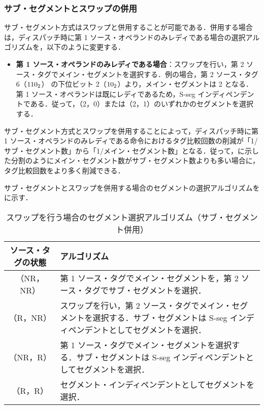 \subsubsection{サブ・セグメントとスワップの併用}
サブ・セグメント方式はスワップと併用することが可能である．併用する場合は，ディスパッチ時に第 1 ソース・オペランドのみレディである場合の選択アルゴリズムを，以下のように変更する．
\begin{itemize}
  \item \textbf{第 1 ソース・オペランドのみレディである場合}：スワップを行い，第 2 ソース・タグでメイン・セグメントを選択する．例の場合，第 2 ソース・タグ 6（${\rm 110_2}$） の下位ビット 2（${\rm 10_2}$）より，メイン・セグメントは 2 となる．第 1 ソース・オペランドは既にレディであるため，S-seg インディペンデントである．従って，（2，0）または（2，1）のいずれかのセグメントを選択する．
\end{itemize}
サブ・セグメント方式とスワップを併用することによって，ディスパッチ時に第 1 ソース・オペランドのみレディである命令におけるタグ比較回数の削減が「1/サブ・セグメント数」から「1/メイン・セグメント数」となる．従って，に示した分割のようにメイン・セグメント数がサブ・セグメント数よりも多い場合に，タグ比較回数をより多く削減できる．

サブ・セグメントとスワップを併用する場合のセグメントの選択アルゴリズムをに示す．

\begin{table}[htb]
  \caption{スワップを行う場合のセグメント選択アルゴリズム（サブ・セグメント併用）}
  \footnotesize
  \center
   \begin{tabular}{|c|p{13cm}|} \hline \hline
    ソース・タグの状態 & アルゴリズム \\ \hline
    （NR，NR） & 第 1 ソース・タグでメイン・セグメントを，第 2 ソース・タグでサブ・セグメントを選択． \\ \hline
    （R，NR） & スワップを行い，第 2 ソース・タグでメイン・セグメントを選択する．サブ・セグメントは S-seg インディペンデントとしてセグメントを選択．\\ \hline
    （NR，R） & 第 1 ソース・タグでメイン・セグメントを選択する．サブ・セグメントは S-seg インディペンデントとしてセグメントを選択．\\ \hline
    （R，R） & セグメント・インディペンデントとしてセグメントを選択． \\ \hline
  \end{tabular}
  \label{tab:agg_algorithm_subseg}
\end{table}


